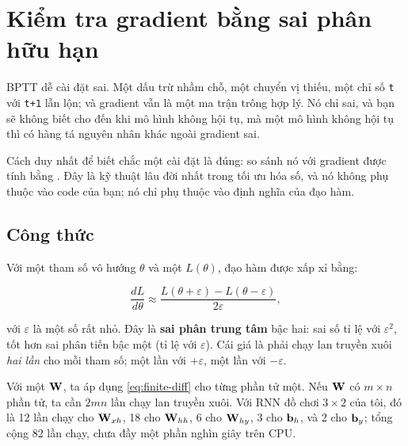%

\section{Kiểm tra gradient bằng sai phân hữu hạn}
\label{sec:ch01-gradient-check}

BPTT dễ cài đặt sai. Một dấu trừ nhầm chỗ, một chuyển vị thiếu, một chỉ số
\texttt{t} với \texttt{t+1} lẫn lộn; và gradient vẫn
là một ma trận trông hợp lý. Nó chỉ sai, và bạn sẽ không biết cho đến khi mô
hình không hội tụ, mà một mô hình không hội tụ thì có hàng tá nguyên nhân
khác ngoài gradient sai.

Cách duy nhất để biết chắc một cài đặt
 là đúng: so sánh nó
với gradient được tính bằng
. Đây là kỹ thuật lâu đời
nhất trong tối ưu hóa số, và nó không phụ thuộc vào code của bạn; nó chỉ phụ
thuộc vào định nghĩa của đạo hàm.

\subsection{Công thức}

Với một tham số vô hướng $\theta$ và một 
$L(\theta)$, đạo hàm
được xấp xỉ bằng:

\begin{equation}
  \frac{dL}{d\theta} \approx
  \frac{L(\theta + \varepsilon) - L(\theta - \varepsilon)}{2\varepsilon},
  \label{eq:finite-diff}
\end{equation}

với $\varepsilon$ là một số rất nhỏ. Đây là \textbf{sai phân trung tâm} bậc
hai: sai số tỉ lệ với $\varepsilon^2$, tốt hơn sai phân tiến bậc một (tỉ lệ
với $\varepsilon$). Cái giá là phải chạy lan truyền xuôi \emph{hai lần} cho
mỗi tham số; một lần với $+\varepsilon$, một lần với $-\varepsilon$.

Với một  $\mathbf{W}$, ta áp dụng
\eqref{eq:finite-diff} cho
từng phần tử một. Nếu $\mathbf{W}$ có $m \times n$ phần tử, ta cần $2mn$ lần
chạy lan truyền xuôi. Với RNN đồ chơi $3 \times 2$ của tôi, đó là 12
lần chạy cho $\mathbf{W}_{xh}$, 18 cho $\mathbf{W}_{hh}$, 6 cho $\mathbf{W}_{hy}$,
3 cho $\mathbf{b}_h$, và 2 cho $\mathbf{b}_y$; tổng cộng 82 lần chạy, chưa đầy
một phần nghìn giây trên CPU.

